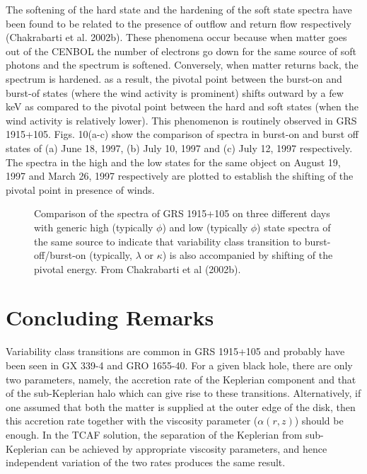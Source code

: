 \documentclass[referee]{cjaa}           %
\begin{document}
The softening of the hard state and the hardening of the soft state spectra have been 
found to be related to the presence of outflow and return flow respectively (Chakrabarti
et al. 2002b). These phenomena occur because when matter goes out of the CENBOL
the number of electrons go down for the same source of soft photons and the spectrum is 
softened. Conversely, when matter returns back, the spectrum is hardened. as a result,
the pivotal point between the burst-on and burst-of states (where the wind activity is
prominent) shifts outward  by a few keV as compared to the pivotal point between the 
hard and soft states (when the wind activity is relatively lower). This phenomenon is 
routinely observed in GRS 1915+105. Figs. 10(a-c) show the comparison of spectra 
in burst-on and burst off states of (a) June 18, 1997,  (b) July 10, 1997 and (c) July 12, 1997
respectively. The spectra in the high and  the low states for the same object on August 19, 1997
and March 26, 1997 respectively are plotted to establish the shifting of the pivotal point
in presence of winds.

\begin{figure}
   \begin{center}
\vskip -1.0cm
   \mbox{\textwidth{}\textwidth{}}
\vskip -8.0cm
   \caption{Comparison of the spectra of GRS 1915+105 on three different days with generic high (typically $\phi$)
and low (typically $\phi$) state spectra of the same source to indicate that variability class transition to 
burst-off/burst-on (typically, $\lambda$ or $\kappa$) is also 
accompanied by shifting of the pivotal energy. From Chakrabarti et al (2002b). } 
   \end{center}
\end{figure}

\section{Concluding Remarks}

Variability class transitions are common in GRS 1915+105 and probably have been seen in GX 339-4 and GRO 1655-40.
For a given black hole, there are only two parameters, namely, the accretion rate of the Keplerian component 
and that of the sub-Keplerian halo which can give rise to these transitions. Alternatively, if one assumed that
both the matter is supplied at the outer edge of the disk, then this accretion rate together with the
viscosity parameter ($\alpha(r,z)$) should be enough. In the TCAF solution, the separation of the Keplerian
from sub-Keplerian can be achieved by appropriate viscosity parameters, and hence independent 
variation of the two rates produces the same result.
\end{document}
